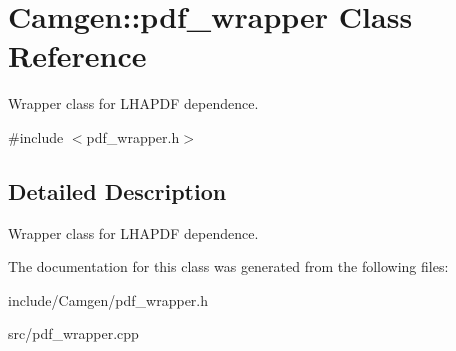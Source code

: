 \hypertarget{a00410}{\section{Camgen\-:\-:pdf\-\_\-wrapper Class Reference}
\label{a00410}
}


Wrapper class for L\-H\-A\-P\-D\-F dependence.  




{\ttfamily \#include $<$pdf\-\_\-wrapper.\-h$>$}



\subsection{Detailed Description}
Wrapper class for L\-H\-A\-P\-D\-F dependence. 

The documentation for this class was generated from the following files\-:\begin{DoxyCompactItemize}
\item 
include/\-Camgen/pdf\-\_\-wrapper.\-h\item 
src/pdf\-\_\-wrapper.\-cpp\end{DoxyCompactItemize}
